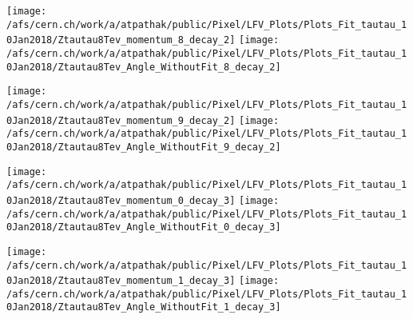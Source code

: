 \documentclass{beamer}
\begin{document}
\begin{frame}
\begin{normalsize}
\begin{center}
\texttt{[image: /afs/cern.ch/work/a/atpathak/public/Pixel/LFV\_Plots/Plots\_Fit\_tautau\_10Jan2018/Ztautau8Tev\_momentum\_8\_decay\_2]}
\texttt{[image: /afs/cern.ch/work/a/atpathak/public/Pixel/LFV\_Plots/Plots\_Fit\_tautau\_10Jan2018/Ztautau8Tev\_Angle\_WithoutFit\_8\_decay\_2]} 
\end{center}
\end{normalsize}
\end {frame}
\begin{frame}
\begin{normalsize}
\begin{center}
\texttt{[image: /afs/cern.ch/work/a/atpathak/public/Pixel/LFV\_Plots/Plots\_Fit\_tautau\_10Jan2018/Ztautau8Tev\_momentum\_9\_decay\_2]}
\texttt{[image: /afs/cern.ch/work/a/atpathak/public/Pixel/LFV\_Plots/Plots\_Fit\_tautau\_10Jan2018/Ztautau8Tev\_Angle\_WithoutFit\_9\_decay\_2]} 
\end{center}
\end{normalsize}
\end {frame}
\begin{frame}
\begin{normalsize}
\begin{center}
\texttt{[image: /afs/cern.ch/work/a/atpathak/public/Pixel/LFV\_Plots/Plots\_Fit\_tautau\_10Jan2018/Ztautau8Tev\_momentum\_0\_decay\_3]}
\texttt{[image: /afs/cern.ch/work/a/atpathak/public/Pixel/LFV\_Plots/Plots\_Fit\_tautau\_10Jan2018/Ztautau8Tev\_Angle\_WithoutFit\_0\_decay\_3]} 
\end{center}
\end{normalsize}
\end {frame}
\begin{frame}
\begin{normalsize}
\begin{center}
\texttt{[image: /afs/cern.ch/work/a/atpathak/public/Pixel/LFV\_Plots/Plots\_Fit\_tautau\_10Jan2018/Ztautau8Tev\_momentum\_1\_decay\_3]}
\texttt{[image: /afs/cern.ch/work/a/atpathak/public/Pixel/LFV\_Plots/Plots\_Fit\_tautau\_10Jan2018/Ztautau8Tev\_Angle\_WithoutFit\_1\_decay\_3]} 
\end{center}
\end{normalsize}
\end {frame}
\end{document}
